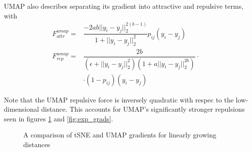 \documentclass{article}
\theoremstyle{definition}
\begin{document}
UMAP also describes separating its gradient into attractive and repulsive terms, with
\begin{align}
    F_{attr}^{umap} = &\dfrac{-2ab||y_i - y_j||_2^{2(b-1)}}{1 + ||y_i - y_j||_2^2} p_{ij} (y_i - y_j) \\
    F_{rep}^{umap} = &\dfrac{2b}{(\epsilon + ||y_i - y_j||_2^2)(1 + a ||y_i - y_j||_2^{2b})} \cdot \\
    &\cdot (1 - p_{ij}) (y_i - y_j) \label{umap_rep}
\end{align}

Note that the UMAP repulsive force is inversely quadratic with respec to the low-dimensional distance. This accounts for UMAP's significantly stronger
repulsions seen in figures \ref{fig:linear_grads} and \ref{fig:exp_grads}.

\begin{figure}
\centering
	\qquad
	\caption{A comparison of tSNE and UMAP gradients for linearly growing distances}%
	\label{fig:linear_grads}%
\end{figure}
\end{document}
